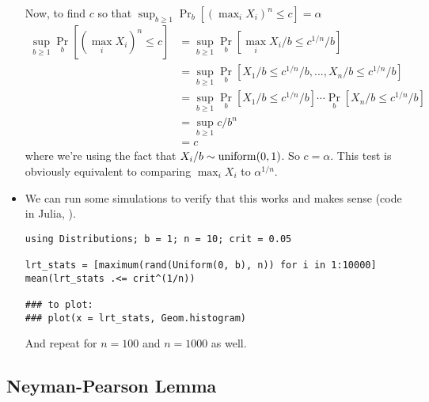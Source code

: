 \begin{itemize}[leftmargin=0pt]
\begin{ex}
    Now, to find $c$ so that $\sup_{b \geq 1} \Pr_b[(\max_i X_i)^n \leq c] = \alpha$
    \begin{align*}
      \sup_{b \geq 1} \Pr_b[(\max_i X_i)^n \leq c]
      &= \sup_{b\geq 1} \Pr_b[\max_i X_i/b \leq c^{1/n}/b] \\
      &= \sup_{b \geq 1} \Pr_b[X_1/b \leq c^{1/n}/b, ..., X_n/b \leq c^{1/n}/b] \\
      &= \sup_{b \geq 1} \Pr_b[X_1/b \leq c^{1/n}/b] \cdots \Pr_b[X_n/b \leq c^{1/n}/b] \\
      &= \sup_{b \geq 1} c/b^n \\
      &= c
    \end{align*}
    where we're using the fact that $X_i/b \sim \operatorname{uniform}(0,1)$.  So
    $c=\alpha$.  This test is obviously equivalent to comparing $\max_i
    X_i$ to $\alpha^{1/n}$.
  \end{ex}

\item We can run some simulations to verify that this works and makes
  sense (code in Julia, \citealp{BKS12}).
  \begin{Verbatim}
using Distributions; b = 1; n = 10; crit = 0.05

lrt_stats = [maximum(rand(Uniform(0, b), n)) for i in 1:10000]
mean(lrt_stats .<= crit^(1/n))

### to plot:
### plot(x = lrt_stats, Geom.histogram)
  \end{Verbatim}
  And repeat for $n = 100$ and $n = 1000$ as well.
\end{itemize}

\subsection{Neyman-Pearson Lemma}

